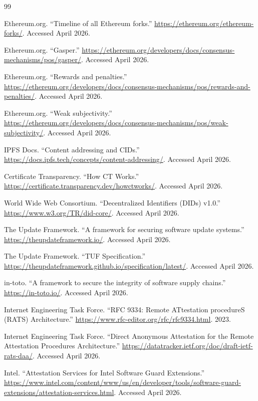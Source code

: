 \documentclass[11pt,letterpaper]{article}
\begin{document}
\begin{thebibliography}{99}

Ethereum.org. ``Timeline of all Ethereum forks.'' \url{https://ethereum.org/ethereum-forks/}. Accessed April 2026.

Ethereum.org. ``Gasper.'' \url{https://ethereum.org/developers/docs/consensus-mechanisms/pos/gasper/}. Accessed April 2026.

Ethereum.org. ``Rewards and penalties.'' \url{https://ethereum.org/developers/docs/consensus-mechanisms/pos/rewards-and-penalties/}. Accessed April 2026.

Ethereum.org. ``Weak subjectivity.'' \url{https://ethereum.org/developers/docs/consensus-mechanisms/pos/weak-subjectivity/}. Accessed April 2026.

IPFS Docs. ``Content addressing and CIDs.'' \url{https://docs.ipfs.tech/concepts/content-addressing/}. Accessed April 2026.

Certificate Transparency. ``How CT Works.'' \url{https://certificate.transparency.dev/howctworks/}. Accessed April 2026.

World Wide Web Consortium. ``Decentralized Identifiers (DIDs) v1.0.'' \url{https://www.w3.org/TR/did-core/}. Accessed April 2026.

The Update Framework. ``A framework for securing software update systems.'' \url{https://theupdateframework.io/}. Accessed April 2026.

The Update Framework. ``TUF Specification.'' \url{https://theupdateframework.github.io/specification/latest/}. Accessed April 2026.

in-toto. ``A framework to secure the integrity of software supply chains.'' \url{https://in-toto.io/}. Accessed April 2026.

Internet Engineering Task Force. ``RFC 9334: Remote ATtestation procedureS (RATS) Architecture.'' \url{https://www.rfc-editor.org/rfc/rfc9334.html}. 2023.

Internet Engineering Task Force. ``Direct Anonymous Attestation for the Remote Attestation Procedures Architecture.'' \url{https://datatracker.ietf.org/doc/draft-ietf-rats-daa/}. Accessed April 2026.

Intel. ``Attestation Services for Intel Software Guard Extensions.'' \url{https://www.intel.com/content/www/us/en/developer/tools/software-guard-extensions/attestation-services.html}. Accessed April 2026.


\end{thebibliography}
\end{document}
